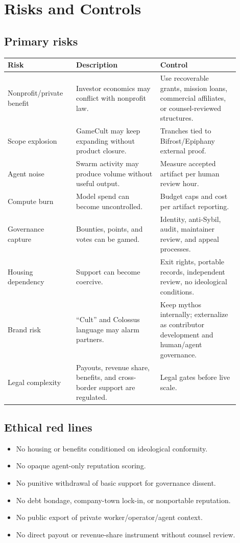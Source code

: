 \documentclass[11pt,oneside]{report}
\begin{document}
\chapter{Risks and Controls}

\section{Primary risks}

\begin{longtable}{P{0.26\linewidth}P{0.33\linewidth}P{0.31\linewidth}}
\toprule
\textbf{Risk} & \textbf{Description} & \textbf{Control} \\
\midrule
Nonprofit/private benefit & Investor economics may conflict with nonprofit law. & Use recoverable grants, mission loans, commercial affiliates, or counsel-reviewed structures. \\
Scope explosion & GameCult may keep expanding without product closure. & Tranches tied to Bifrost/Epiphany external proof. \\
Agent noise & Swarm activity may produce volume without useful output. & Measure accepted artifact per human review hour. \\
Compute burn & Model spend can become uncontrolled. & Budget caps and cost per artifact reporting. \\
Governance capture & Bounties, points, and votes can be gamed. & Identity, anti-Sybil, audit, maintainer review, and appeal processes. \\
Housing dependency & Support can become coercive. & Exit rights, portable records, independent review, no ideological conditions. \\
Brand risk & ``Cult'' and Colossus language may alarm partners. & Keep mythos internally; externalize as contributor development and human/agent governance. \\
Legal complexity & Payouts, revenue share, benefits, and cross-border support are regulated. & Legal gates before live scale. \\
\bottomrule
\end{longtable}

\section{Ethical red lines}

\begin{itemize}
  \item No housing or benefits conditioned on ideological conformity.
  \item No opaque agent-only reputation scoring.
  \item No punitive withdrawal of basic support for governance dissent.
  \item No debt bondage, company-town lock-in, or nonportable reputation.
  \item No public export of private worker/operator/agent context.
  \item No direct payout or revenue-share instrument without counsel review.
\end{itemize}
\end{document}
